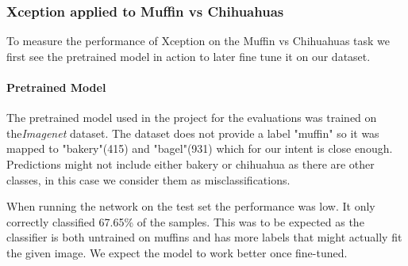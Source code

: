 \subsubsection{Xception applied to Muffin vs Chihuahuas}
\label{subsubsec:xception}

To measure the performance of Xception on the Muffin vs Chihuahuas task we first see the pretrained model in action
to later fine tune it on our dataset.

\paragraph{Pretrained Model} The pretrained model used in the project for the evaluations was trained on the\textit{Imagenet} dataset.
The dataset does not provide a label "muffin" so it was mapped to "bakery"(415) and "bagel"(931) which for our intent is close enough.
Predictions might not include either bakery or chihuahua as there are other classes, in this case we consider them as misclassifications.

When running the network on the test set the performance was low.
It only correctly classified 67.65\% of the samples.
This was to be expected as the classifier is both untrained on muffins and has more labels that might actually fit the given image.
We expect the model to work better once fine-tuned.


